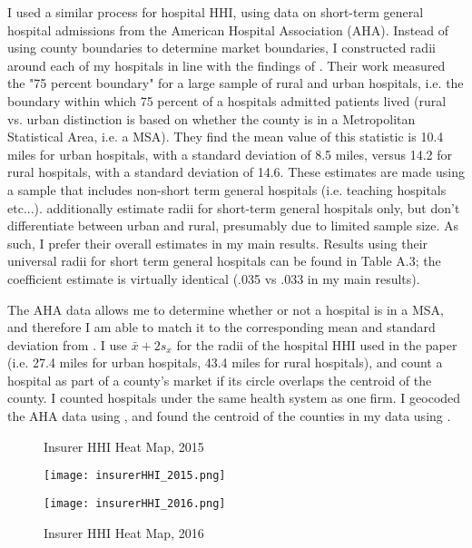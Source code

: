 \documentclass[12pt,letterpaper]{article}
\begin{document}
I used a similar process for hospital HHI, using data on short-term general hospital admissions from the American Hospital Association (AHA). Instead of using county boundaries to determine market boundaries, I constructed radii around each of my hospitals in line with the findings of \citet{gresenz_updated_2004}. Their work measured the "75 percent boundary" for a large sample of rural and urban hospitals, i.e. the boundary within which 75 percent of a hospitals admitted patients lived (rural vs. urban distinction is based on whether the county is in a Metropolitan Statistical Area, i.e. a MSA). They find the mean value of this statistic is 10.4 miles for urban hospitals, with a standard deviation of 8.5 miles, versus 14.2 for rural hospitals, with a standard deviation of 14.6. These estimates are made using a sample that includes non-short term general hospitals (i.e. teaching hospitals etc...). \citet{gresenz_updated_2004} additionally estimate radii for short-term general hospitals only, but don't differentiate between urban and rural, presumably due to limited sample size. As such, I prefer their overall estimates in my main results. Results using their universal radii for short term general hospitals can be found in Table A.3; the coefficient estimate is virtually identical (.035 vs .033 in my main results).   

The AHA data allows me to determine whether or not a hospital is in a MSA, and therefore I am able to match it to the corresponding mean and standard deviation from \citet{gresenz_updated_2004}. I use $\bar{x} + 2s_x$ for the radii of the hospital HHI used in the paper (i.e. 27.4 miles for urban hospitals, 43.4 miles for rural hospitals), and count a hospital as part of a county's market if its circle overlaps the centroid of the county. I counted hospitals under the same health system as one firm. I geocoded the AHA data using \citet{kahle_ggmap_2013}, and found the centroid of the counties in my data using \citet{bivand_rgeos_2020}. 

\begin{figure}[!h]
\begin{center}
\caption{Insurer HHI Heat Map, 2015}\label{Figure 5}
\texttt{[image: insurerHHI\_2015.png]}
\vspace{5mm}
\caption{Insurer HHI Heat Map, 2016}\label{Figure 6}
\texttt{[image: insurerHHI\_2016.png]}
\end{center}
\end{figure}
\end{document}
